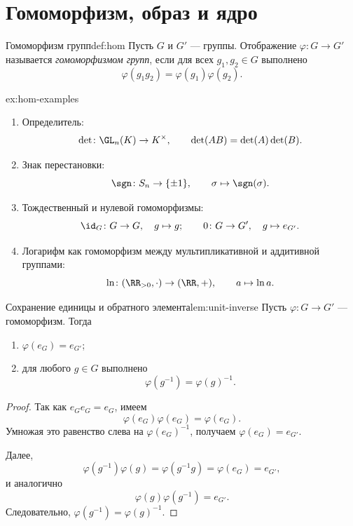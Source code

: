 
\section{Гомоморфизм, образ и ядро}

\begin{Definition}{Гомоморфизм групп}{def:hom}
	Пусть $G$ и $G'$ --- группы. Отображение $\varphi\colon G \to G'$
	называется \emph{гомоморфизмом групп}, если для всех $g_1,g_2\in G$ выполнено
	\[
	\varphi(g_1g_2)=\varphi(g_1)\varphi(g_2).
	\]
\end{Definition}

\begin{Example}{}{ex:hom-examples}
	\begin{enumerate}
		\item Определитель:
		\[
		\det\colon \GL_n(K) \to K^{\times}, \qquad \det(AB)=\det(A)\det(B).
		\]
		\item Знак перестановки:
		\[
		\sgn\colon S_n \to \{\pm 1\}, \qquad \sigma \mapsto \sgn(\sigma).
		\]
		\item Тождественный и нулевой гомоморфизмы:
		\[
		\id_G\colon G\to G, \quad g\mapsto g;
		\qquad
		0\colon G\to G', \quad g\mapsto e_{G'}.
		\]
		\item Логарифм как гомоморфизм между мультипликативной и аддитивной группами:
		\[
		\ln\colon (\RR_{>0},\cdot) \to (\RR,+), \qquad a\mapsto \ln a.
		\]
	\end{enumerate}
\end{Example}

\begin{Lemma}{Сохранение единицы и обратного элемента}{lem:unit-inverse}
	Пусть $\varphi\colon G\to G'$ --- гомоморфизм. Тогда
	\begin{enumerate}
		\item $\varphi(e_G)=e_{G'}$;
		\item для любого $g\in G$ выполнено
		\[
		\varphi(g^{-1})=\varphi(g)^{-1}.
		\]
	\end{enumerate}
\end{Lemma}

\begin{proof}
	Так как $e_Ge_G=e_G$, имеем
	\[
	\varphi(e_G)\varphi(e_G)=\varphi(e_G).
	\]
	Умножая это равенство слева на $\varphi(e_G)^{-1}$, получаем $\varphi(e_G)=e_{G'}$.

	Далее,
	\[
	\varphi(g^{-1})\varphi(g)=\varphi(g^{-1}g)=\varphi(e_G)=e_{G'},
	\]
	и аналогично
	\[
	\varphi(g)\varphi(g^{-1})=e_{G'}.
	\]
	Следовательно, $\varphi(g^{-1})=\varphi(g)^{-1}$.
\end{proof}

